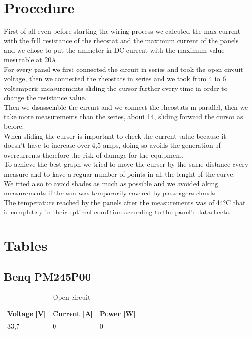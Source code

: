 \documentclass[12pt]{article}
\begin{document}
\section{Procedure}
First of all even before starting the wiring process we calcuted the max current with the
full resistance of the rheostat and the maximum current of the panels and we chose to put the ammeter in
DC current with the maximum value mesurable at 20A.\\
For every panel we first connected the circuit in series and took the open circuit voltage, then we connected
the rheostats in series and we took from 4 to 6 voltamperic measurements sliding the cursor further every time
in order to change the resistance value.\\
Then we disassemble the  circuit and we connect the rheostats in parallel, then we take more measurements than
the series, about 14, sliding forward the cursor as before.\\
When sliding the cursor is important to check the current value because it doesn't have to increase over 4,5 amps,
doing so avoids the generation of overcurrents therefore the risk of damage for the equipment.\\
To achieve the best graph we tried to move the cursor by the same distance every measure and to have a reguar
number of points in all the lenght of the curve.\\
We tried also to avoid shades as much as possible and we avoided aking measurements if the sun was temporarily
covered by passengers clouds.\\
The temperature reached by the panels after the measurements was of 44°C that is completely in their optimal
condition according to the panel's datasheets.\\
\newpage

\section{Tables}
\subsection{Benq PM245P00}
\begin{table}[h]
	\centering
	\begin{tabular}{|p{2cm}|p{2cm}|p{2cm}|}
		\hline
		\rowcolor{RoyalBlue!80} Voltage [V] & Current [A] & Power [W] \\
		\hline
		\rowcolor{Cerulean!70} 33,7         & 0           & 0         \\
		\hline
	\end{tabular}
	\caption{Open circuit}
	\label{tab:my_label}
\end{table}
\end{document}
